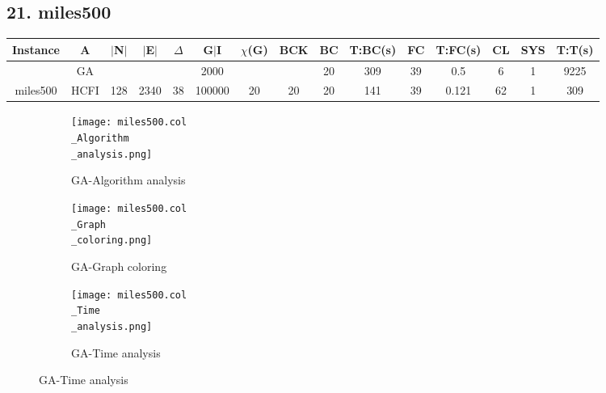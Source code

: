 \documentclass[10pt]{article}
\begin{document}
\subsection*{\hspace{0,9073976cm} 21. miles500}
\begin{table}[H]
\centering
\begin{tabular}{|c|c|c|c|c|c|c|c|c|c|c|c|c|c|c|}
\hline
Instance& A &$|$N$|$ & $|$E$|$ & $\Delta$ & G$|$I & $\chi$(G) &BCK&BC & T:BC(s) & FC & T:FC(s) & CL & SYS & T:T(s) \\ \hline \hline
&GA&       &                   &                     &2000         &     \cellcolor{yellow} & {\cellcolor{yellow}}& {{\cellcolor{green}20}}
&309   &39        & 0.5                  & 6                   &1          &9225        \\ \cline{2-2} \cline{6-6} \cline{9-15}
 \multirow{-2}{*}{miles500} &HCFI   &\multirow{-2}{*}{128}   &\multirow{-2}{*}{2340}     &\multirow{-2}{*}{38}     &100000     &\multirow{-2}{*}{\cellcolor{yellow}20}      & \multirow{-2}{*}{\cellcolor{yellow}20}    &{\cellcolor{green}20}     &141         &39    &0.121         &62    &1     &309        \\ \hline 
\end{tabular}
\end{table}
\graphicspath{{./Core1/Solutions/GA/miles500.col}}
\begin{figure}[H]
\begin{subfigure}{.33\textwidth}
  \centering
  \texttt{[image: miles500.col\\\_Algorithm\\\_analysis.png]}
  \caption{GA-Algorithm analysis}
   \label{fig:subfig1}
\end{subfigure}%
\begin{subfigure}{.33\textwidth}
  \centering
  \texttt{[image: miles500.col\\\_Graph\\\_coloring.png]}
  \caption{GA-Graph coloring}
  \label{fig:subfig2}
\end{subfigure}
\begin{subfigure}{.33\textwidth}
  \centering
  \texttt{[image: miles500.col\\\_Time\\\_analysis.png]}
  \caption{GA-Time analysis}
  \end{subfigure}
\end{figure}
\end{document}
